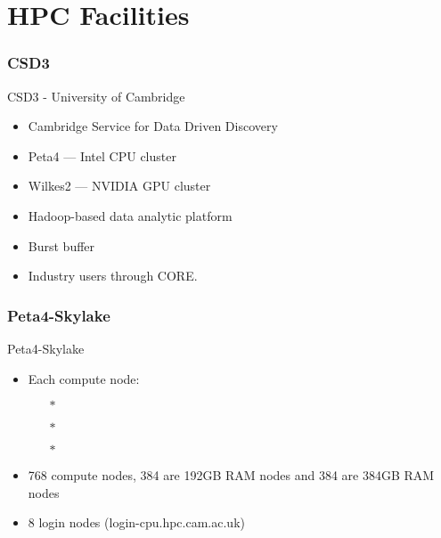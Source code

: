 \part{HPC Facilities}
\begin{frame}
\partpage
\end{frame}

\section{CSD3}
\begin{frame}{CSD3 - University of Cambridge}
\begin{itemize}
\item{Cambridge Service for Data Driven Discovery}
\pause
\medskip
\item{\alert{Peta4 --- Intel CPU cluster}}
\pause
\item{\alert{Wilkes2 --- NVIDIA GPU cluster}}
\pause
\medskip
\item{Hadoop-based data analytic platform}
\item{Burst buffer}
\item{Industry users through CORE.}
\end{itemize}
\end{frame}

\section{Peta4-Skylake}
\begin{frame}{Peta4-Skylake}
\begin{itemize}
\item{Each compute node:}
\begin{itemize}
\item[$\ast$]{}
\item[$\ast$]{}
\item[$\ast$]{}
\end{itemize}
\item{768 compute nodes, 384 are 192GB RAM nodes and 384 are 384GB RAM nodes}
\item{8 login nodes (\alert{login-cpu.hpc.cam.ac.uk})}
\end{itemize}
\end{frame}

